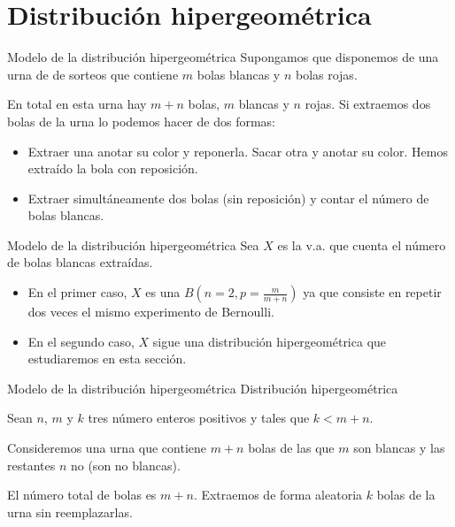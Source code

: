 \documentclass[
  ignorenonframetext,
  aspectratio=169]{beamer}
\providecommand{\tightlist}{%
  \setlength{\itemsep}{0pt}\setlength{\parskip}{0pt}}\usepackage{longtable,booktabs,array}
\begin{document}
\hypertarget{distribuciuxf3n-hipergeomuxe9trica}{%
\section{Distribución
hipergeométrica}\label{distribuciuxf3n-hipergeomuxe9trica}}

\begin{frame}{Modelo de la distribución hipergeométrica}
\protect\hypertarget{modelo-de-la-distribuciuxf3n-hipergeomuxe9trica}{}
Supongamos que disponemos de una urna de de sorteos que contiene \(m\)
bolas blancas y \(n\) bolas rojas.

En total en esta urna hay \(m+n\) bolas, \(m\) blancas y \(n\) rojas. Si
extraemos dos bolas de la urna lo podemos hacer de dos formas:

\begin{itemize}
\tightlist
\item
  Extraer una anotar su color y reponerla. Sacar otra y anotar su color.
  Hemos extraído la bola con reposición.
\item
  Extraer simultáneamente dos bolas (sin reposición) y contar el número
  de bolas blancas.
\end{itemize}
\end{frame}

\begin{frame}{Modelo de la distribución hipergeométrica}
\protect\hypertarget{modelo-de-la-distribuciuxf3n-hipergeomuxe9trica-1}{}
Sea \(X\) es la v.a. que cuenta el número de bolas blancas extraídas.

\begin{itemize}
\tightlist
\item
  En el primer caso, \(X\) es una \(B(n=2,p=\frac{m}{m+n})\) ya que
  consiste en repetir dos veces el mismo experimento de Bernoulli.
\item
  En el segundo caso, \(X\) sigue una distribución hipergeométrica que
  estudiaremos en esta sección.
\end{itemize}
\end{frame}

\begin{frame}{Modelo de la distribución hipergeométrica}
\protect\hypertarget{modelo-de-la-distribuciuxf3n-hipergeomuxe9trica-2}{}
Distribución hipergeométrica

Sean \(n\), \(m\) y \(k\) tres número enteros positivos y tales que
\(k<m+n\).

Consideremos una urna que contiene \(m+n\) bolas de las que \(m\) son
blancas y las restantes \(n\) no (son no blancas).

El número total de bolas es \(m+n\). Extraemos de forma aleatoria \(k\)
bolas de la urna sin reemplazarlas.
\end{frame}
\end{document}
